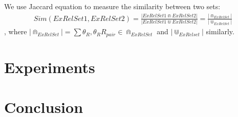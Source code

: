 \documentclass{llncs}
\begin{document}
We use Jaccard equation to measure the similarity between two sets:
\begin{equation}
	\begin{aligned}
		Sim(ExRelSet1,ExRelSet2)=\frac{|ExRelSet1\Cap ExRelSet2|}{|ExRelSet1\Cup ExRelSet2|}=\frac{|\Cap_{ExRelSet}|}{|\Cup_{ExRelSet}|}
	\end{aligned}
\end{equation}
, where $|\Cap_{ExRelSet}|=\sum\theta_{R},\theta_{R}R_{pair}\in\Cap_{ExRelSet}$ and $|\Cup_{ExRelset}|$ similarly.



\section{Experiments}\label{sec:experiments}

\section{Conclusion}\label{sec:conclusion}




\end{document}
